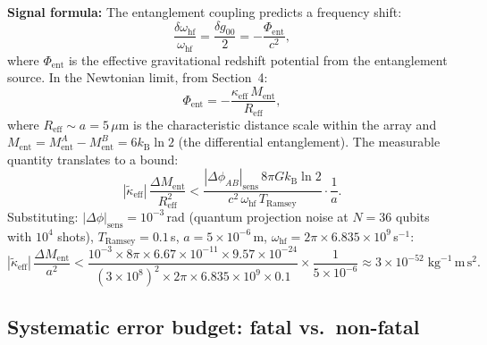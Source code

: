 \documentclass[12pt,letterpaper]{article}
\theoremstyle{plain}
\theoremstyle{definition}
\theoremstyle{remark}
\newcommand{\kB}{k_{\mathrm{B}}}
\newcommand{\kteff}{\tilde{\kappa}_{\mathrm{eff}}}
\newcommand{\Ment}{M_{\mathrm{ent}}}
\begin{document}
\textbf{Signal formula:} The entanglement coupling predicts a frequency shift:
\begin{equation}
  \frac{\delta\omega_{\mathrm{hf}}}{\omega_{\mathrm{hf}}}
  = \frac{\delta g_{00}}{2}
  = -\frac{\Phi_{\mathrm{ent}}}{c^2},
  \label{eq:freq-shift}
\end{equation}
where $\Phi_{\mathrm{ent}}$ is the effective gravitational redshift potential from the entanglement source. In the Newtonian limit, from Section~4:
\begin{equation}
  \Phi_{\mathrm{ent}} = -\frac{\kappa_{\mathrm{eff}}\,\Ment}{R_{\mathrm{eff}}},
  \label{eq:Phi-ent}
\end{equation}
where $R_{\mathrm{eff}} \sim a = 5\,\mu$m is the characteristic distance scale within the array and $\Ment = M_{\mathrm{ent}}^A - M_{\mathrm{ent}}^B = 6\kB\ln 2$ (the differential entanglement). The measurable quantity translates to a bound:
\begin{equation}
  \boxed{
  |\kteff|\,\frac{\Delta\Ment}{R_{\mathrm{eff}}^2}
  < \frac{|\Delta\phi_{AB}|_{\mathrm{sens}}\,8\pi G\kB\ln 2}{c^2\,\omega_{\mathrm{hf}}\,T_{\mathrm{Ramsey}}}
  \cdot\frac{1}{a}.
  }
  \label{eq:bound}
\end{equation}
Substituting: $|\Delta\phi|_{\mathrm{sens}} = 10^{-3}$\,rad (quantum projection noise at $N=36$ qubits with $10^4$ shots), $T_{\mathrm{Ramsey}} = 0.1$\,s, $a = 5\times10^{-6}$\,m, $\omega_{\mathrm{hf}} = 2\pi\times6.835\times10^9$\,s$^{-1}$:
\begin{equation}
  |\kteff|\,\frac{\Delta\Ment}{a^2}
  < \frac{10^{-3}\times8\pi\times6.67\times10^{-11}\times9.57\times10^{-24}}
         {(3\times10^8)^2\times2\pi\times6.835\times10^9\times0.1}
  \times\frac{1}{5\times10^{-6}}
  \approx 3\times10^{-52}\;\text{kg}^{-1}\,\text{m}\,\text{s}^2.
  \label{eq:bound-numerical}
\end{equation}

\subsection{Systematic error budget: fatal vs.\ non-fatal}
\end{document}
